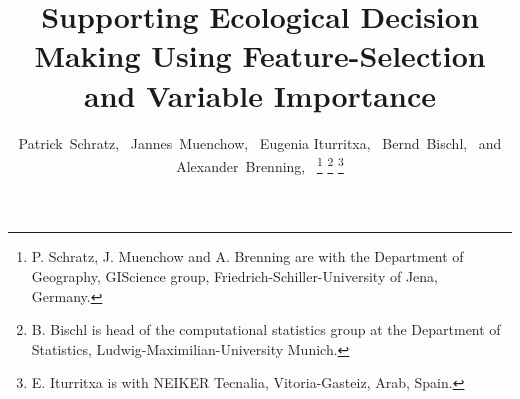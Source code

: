 \documentclass[letterpaper, journal]{IEEEtran}
\begin{document}
%
\title{Supporting Ecological Decision Making Using Feature-Selection and Variable Importance}
%
%
%

\author{Patrick~Schratz,~
        Jannes~Muenchow,~
        Eugenia Iturritxa,~
        Bernd~Bischl,~
        and Alexander~Brenning,~
\thanks{P. Schratz, J. Muenchow and A. Brenning are with the Department
of Geography, GIScience group, Friedrich-Schiller-University of Jena, Germany.}%
\thanks{B. Bischl is head of the computational statistics group at the Department of Statistics, Ludwig-Maximilian-University Munich.}%
\thanks{E. Iturritxa is with NEIKER Tecnalia, Vitoria-Gasteiz, Arab, Spain.}%
}

%
%
\end{document}
